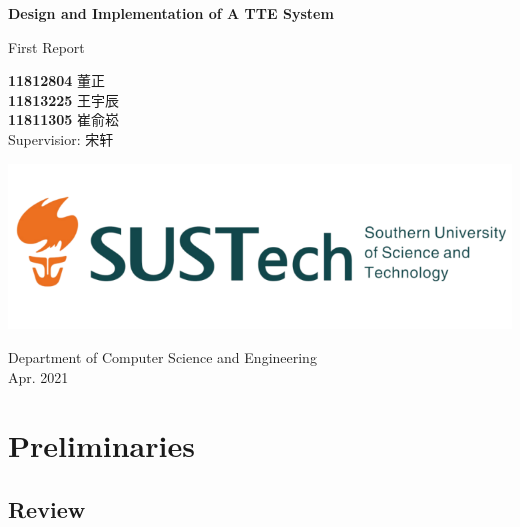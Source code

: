 \documentclass[fontset=none]{ctexart}
\theoremstyle{definition}
\theoremstyle{remark}
\begin{document}
\begin{titlepage}
    \begin{center}
        \vspace*{1cm}
            
        \Huge
        \textbf{Design and Implementation of A TTE System}
            
        \vspace{0.5cm}
        \LARGE
        First Report\\
            
        \vspace{1.5cm}
            
        \textbf{11812804}  董\quad 正\\
        \textbf{11813225}  王宇辰\\
        \textbf{11811305}  崔俞崧\\

        \vspace{0.5cm}
        Supervisior: 宋轩
            
        \vfill
            
        \includegraphics[width=\textwidth]{images/sustc.png}
            
        \vspace{0.2cm}
            
        \Large
        Department of Computer Science and Engineering\\
        \vspace{0.5cm}
        Apr. 2021
            
    \end{center}
\end{titlepage}

\tableofcontents

\clearpage
\section{Preliminaries}
\subsection{Review}
\end{document}
